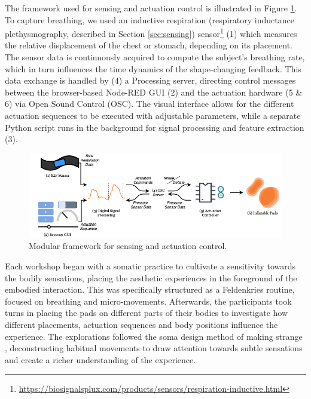 The framework used for sensing and actuation control is illustrated in Figure \ref{fig:workflow}.
To capture breathing, we used an inductive respiration (respiratory inductance plethysmography, described in Section \ref{sec:sensing}) sensor\footnote{\url{https://biosignalsplux.com/products/sensors/respiration-inductive.html}} (1) which measures the relative displacement of the chest or stomach, depending on its placement. The sensor data is continuously acquired to compute the subject's breathing rate, which in turn influences the time dynamics of the shape-changing feedback. This data exchange is handled by (4) a Processing server, directing control messages between the browser-based Node-RED GUI (2) and the actuation hardware (5 \& 6) via Open Sound Control (OSC). The visual interface allows for the different actuation sequences to be executed with adjustable parameters, while a separate Python script runs in the background for signal processing and feature extraction (3).

\begin{figure}[t]
    \centering
    \includegraphics[width=1.0\linewidth]{Chapters/Figures/soma_chi/fig_2_framework.png}
    \caption{Modular framework for sensing and actuation control.}
    \label{fig:workflow}
\end{figure}


Each workshop began with a somatic practice to cultivate a sensitivity towards the bodily sensations, placing the aesthetic experiences in the foreground of the embodied interaction. This was specifically structured as a Feldenkries routine, focused on breathing and micro-movements. Afterwards, the participants took turns in placing the pads on different parts of their bodies to investigate how different placements, actuation sequences and body positions influence the experience. The explorations followed the soma design method of making strange \cite{loke_moving_2013}, deconstructing habitual movements to draw attention towards subtle sensations and create a richer understanding of the experience.

